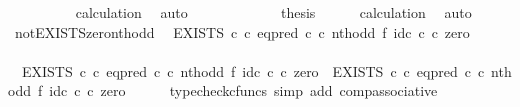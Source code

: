 \begin{isabellebody}
\ \ \ \ \ \ \ \ \isamarkupfalse%
\ calculation\ \isamarkupfalse%
\ auto\isanewline
\ \ \ \ \isamarkupfalse%
\isanewline
\ \ \isamarkupfalse%
\isanewline
\ \ \isamarkupfalse%
\ \isamarkupfalse%
\ {\isacharquery}{\kern0pt}thesis\isanewline
\ \ \ \ \isamarkupfalse%
\ calculation\ \isamarkupfalse%
\ auto\isanewline
{}\isamarkupfalse%
%
\endisatagproof
{\isafoldproof}%
%
\isadelimproof
\isanewline
%
\endisadelimproof
\isanewline
{}\isamarkupfalse%
\ not{\isacharunderscore}{\kern0pt}EXISTS{\isacharunderscore}{\kern0pt}zero{\isacharunderscore}{\kern0pt}nth{\isacharunderscore}{\kern0pt}odd{\isacharcolon}{\kern0pt}\isanewline
\ \ {\isachardoublequoteopen}{\isacharparenleft}{\kern0pt}EXISTS\ {\isasymnat}\isactrlsub c\ {\isasymcirc}\isactrlsub c\ {\isacharparenleft}{\kern0pt}eq{\isacharunderscore}{\kern0pt}pred\ {\isasymnat}\isactrlsub c\ {\isasymcirc}\isactrlsub c\ nth{\isacharunderscore}{\kern0pt}odd\ {\isasymtimes}\isactrlsub f\ id\isactrlsub c\ {\isasymnat}\isactrlsub c{\isacharparenright}{\kern0pt}\isactrlsup {\isasymsharp}{\isacharparenright}{\kern0pt}\ {\isasymcirc}\isactrlsub c\ zero\ {\isacharequal}{\kern0pt}\ {\isasymf}{\isachardoublequoteclose}\isanewline
%
\isadelimproof
%
\endisadelimproof
%
\isatagproof
{}\isamarkupfalse%
\ {\isacharminus}{\kern0pt}\isanewline
\ \ \isamarkupfalse%
\ \ {\isachardoublequoteopen}{\isacharparenleft}{\kern0pt}EXISTS\ {\isasymnat}\isactrlsub c\ {\isasymcirc}\isactrlsub c\ {\isacharparenleft}{\kern0pt}eq{\isacharunderscore}{\kern0pt}pred\ {\isasymnat}\isactrlsub c\ {\isasymcirc}\isactrlsub c\ nth{\isacharunderscore}{\kern0pt}odd\ {\isasymtimes}\isactrlsub f\ id\isactrlsub c\ {\isasymnat}\isactrlsub c{\isacharparenright}{\kern0pt}\isactrlsup {\isasymsharp}{\isacharparenright}{\kern0pt}\ {\isasymcirc}\isactrlsub c\ zero\ {\isacharequal}{\kern0pt}\ EXISTS\ {\isasymnat}\isactrlsub c\ {\isasymcirc}\isactrlsub c\ {\isacharparenleft}{\kern0pt}eq{\isacharunderscore}{\kern0pt}pred\ {\isasymnat}\isactrlsub c\ {\isasymcirc}\isactrlsub c\ nth{\isacharunderscore}{\kern0pt}odd\ {\isasymtimes}\isactrlsub f\ id\isactrlsub c\ {\isasymnat}\isactrlsub c{\isacharparenright}{\kern0pt}\isactrlsup {\isasymsharp}\ {\isasymcirc}\isactrlsub c\ zero{\isachardoublequoteclose}\isanewline
\ \ \ \ \isamarkupfalse%
\ {\isacharparenleft}{\kern0pt}typecheck{\isacharunderscore}{\kern0pt}cfuncs{\isacharcomma}{\kern0pt}\ simp\ add{\isacharcolon}{\kern0pt}\ comp{\isacharunderscore}{\kern0pt}associative{}{\isacharparenright}{\kern0pt}\isanewline

\end{isabellebody}
